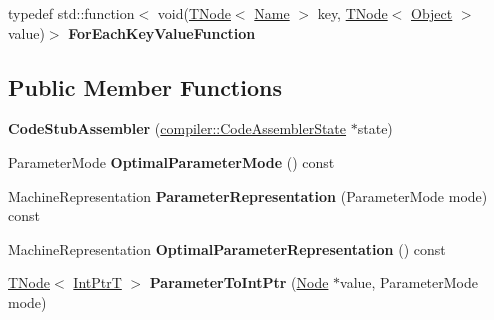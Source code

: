 \begin{DoxyCompactItemize}
\item 
\mbox{\label{classv8_1_1internal_1_1CodeStubAssembler_a9a17597457b85bf4060319ddfcf03edb}} 
typedef std\+::function$<$ void(\mbox{\hyperlink{classv8_1_1internal_1_1compiler_1_1TNode}{T\+Node}}$<$ \mbox{\hyperlink{classv8_1_1internal_1_1Name}{Name}} $>$ key, \mbox{\hyperlink{classv8_1_1internal_1_1compiler_1_1TNode}{T\+Node}}$<$ \mbox{\hyperlink{classv8_1_1internal_1_1Object}{Object}} $>$ value)$>$ {\bfseries For\+Each\+Key\+Value\+Function}
\end{DoxyCompactItemize}
\subsection*{Public Member Functions}
\begin{DoxyCompactItemize}
\item 
\mbox{\label{classv8_1_1internal_1_1CodeStubAssembler_a5bea777236e3c5c2fabb4b8ec0c39f4d}} 
{\bfseries Code\+Stub\+Assembler} (\mbox{\hyperlink{classv8_1_1internal_1_1compiler_1_1CodeAssemblerState}{compiler\+::\+Code\+Assembler\+State}} $\ast$state)
\item 
\mbox{\label{classv8_1_1internal_1_1CodeStubAssembler_afb03e6fda4d81f8db3676c1c10ce4f32}} 
Parameter\+Mode {\bfseries Optimal\+Parameter\+Mode} () const
\item 
\mbox{\label{classv8_1_1internal_1_1CodeStubAssembler_a7a329ec434d69201d29f3453f3705df3}} 
Machine\+Representation {\bfseries Parameter\+Representation} (Parameter\+Mode mode) const
\item 
\mbox{\label{classv8_1_1internal_1_1CodeStubAssembler_a1a20a870bf2b1c6cab9589e9c8881c3d}} 
Machine\+Representation {\bfseries Optimal\+Parameter\+Representation} () const
\item 
\mbox{\label{classv8_1_1internal_1_1CodeStubAssembler_a495641be0482edf9664166daf4b3ee32}} 
\mbox{\hyperlink{classv8_1_1internal_1_1compiler_1_1TNode}{T\+Node}}$<$ \mbox{\hyperlink{structv8_1_1internal_1_1IntPtrT}{Int\+PtrT}} $>$ {\bfseries Parameter\+To\+Int\+Ptr} (\mbox{\hyperlink{classv8_1_1internal_1_1compiler_1_1Node}{Node}} $\ast$value, Parameter\+Mode mode)

\end{DoxyCompactItemize}
